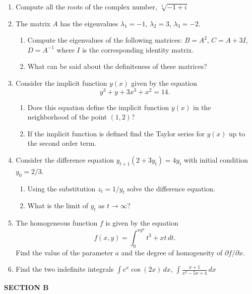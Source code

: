 \begin{enumerate}

\item Compute all the roots of the complex number, $\sqrt[5]{-1+i}$

\item The matrix $A$ has the eigenvalues $\lambda_1=-1$, $\lambda_2=3$, $\lambda_3=-2$.
\begin{enumerate}
\item Compute the eigenvalues of the following matrices: $B=A^2$, $C=A+3I$, $D=A^{-1}$ where $I$ is the corresponding identity matrix.
\item What can be said about the definiteness of these matrices?
\end{enumerate}

\item Consider the implicit function $y(x)$ given by the equation
\[
y^3+y+3x^3+x^2=14.
\]
\begin{enumerate}
\item Does this equation define the implicit function $y(x)$ in the neighborhood of the point $(1,2)$?
\item If the implicit function is defined find the Taylor series for $y(x)$ up to the second order term.
\end{enumerate}


\item Consider the difference equation $y_{t+1}(2+3y_t)=4y_t$ with initial condition $y_0=2/3$.
\begin{enumerate}
\item Using the substitution $z_t=1/y_t$ solve the difference equation.
\item What is the limit of $y_t$ as $t\to\infty$?
\end{enumerate}

\item The homogeneous function $f$ is given by the equation
\[
f(x,y)=\int_0^{xy^a} t^3+xt \, dt.
\]
Find the value of the parameter $a$ and the degree of homogeneity of $\partial f/\partial x$.

\item Find the two indefinite integrals $\int e^x \cos(2x)\,dx$, $\int \frac{x+1}{x^2-5x+4}\, dx$

\end{enumerate}

\vspace{20pt}
\textbf{SECTION B}
\vspace{20pt}


